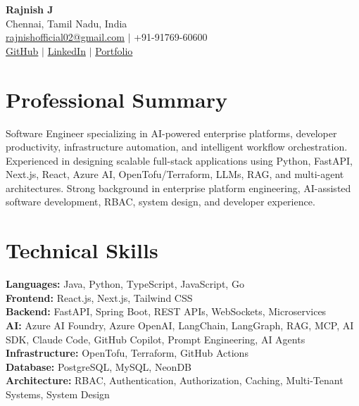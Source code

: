 \documentclass[a4paper,10pt]{article}
\newcommand{\projectdivider}{\vspace{4pt}\textcolor{dividercolor}{\hrule height 0.4pt}\vspace{4pt}}
\newcommand{\expblock}[1]{\noindent\textbf{#1}\par\vspace{1pt}}
\newcommand{\expsubblock}[1]{\noindent\textit{#1}\par\vspace{1pt}}
\begin{document}
\begin{center}
{\LARGE\textbf{Rajnish J}}\\[3pt]
Chennai, Tamil Nadu, India\\[1pt]
\href{mailto:rajnishofficial02@gmail.com}{rajnishofficial02@gmail.com} $|$
+91-91769-60600\\[1pt]
\href{https://github.com/Rajnish-J}{GitHub} $|$
\href{https://www.linkedin.com/in/rajnish7102/}{LinkedIn} $|$
\href{https://rajnish7102.netlify.app/}{Portfolio}
\end{center}

\section*{Professional Summary}
Software Engineer specializing in AI-powered enterprise platforms, developer productivity, infrastructure automation, and intelligent workflow orchestration. Experienced in designing scalable full-stack applications using Python, FastAPI, Next.js, React, Azure AI, OpenTofu/Terraform, LLMs, RAG, and multi-agent architectures. Strong background in enterprise platform engineering, AI-assisted software development, RBAC, system design, and developer experience.

\section*{Technical Skills}
\textbf{Languages:} Java, Python, TypeScript, JavaScript, Go\\
\textbf{Frontend:} React.js, Next.js, Tailwind CSS\\
\textbf{Backend:} FastAPI, Spring Boot, REST APIs, WebSockets, Microservices\\
\textbf{AI:} Azure AI Foundry, Azure OpenAI, LangChain, LangGraph, RAG, MCP, AI SDK, Claude Code, GitHub Copilot, Prompt Engineering, AI Agents\\
\textbf{Infrastructure:} OpenTofu, Terraform, GitHub Actions\\
\textbf{Database:} PostgreSQL, MySQL, NeonDB\\
\textbf{Architecture:} RBAC, Authentication, Authorization, Caching, Multi-Tenant Systems, System Design

\end{document}
